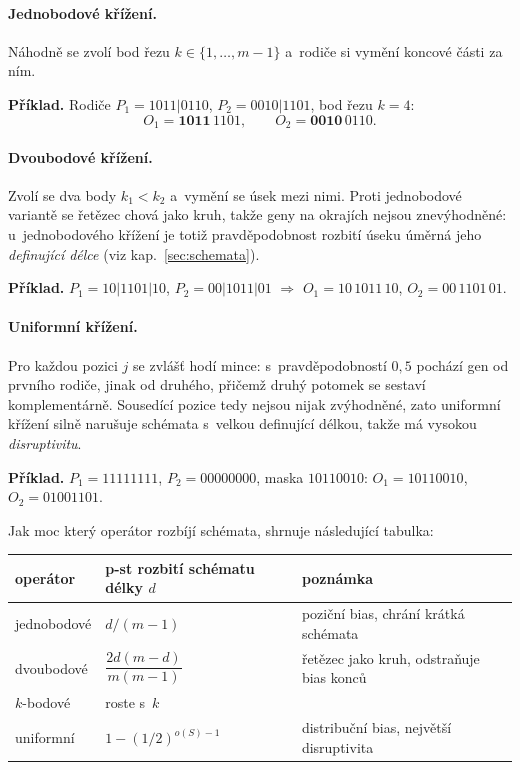 \documentclass[11pt,a4paper]{article}
\theoremstyle{definition}
\begin{document}
\paragraph{Jednobodové křížení.} Náhodně se zvolí bod řezu $k \in \{1,\dots,m-1\}$
a~rodiče si vymění koncové části za ním.

\textbf{Příklad.} Rodiče $P_1 = 1011|0110$, $P_2 = 0010|1101$, bod řezu $k=4$:
\[
O_1 = \mathbf{1011}\,1101, \qquad O_2 = \mathbf{0010}\,0110.
\]

\paragraph{Dvoubodové křížení.} Zvolí se dva body $k_1 < k_2$ a~vymění se úsek mezi nimi.
Proti jednobodové variantě se řetězec chová jako kruh, takže geny na okrajích nejsou
znevýhodněné: u~jednobodového křížení je totiž pravděpodobnost rozbití úseku úměrná jeho
\emph{definující délce} (viz kap.~\ref{sec:schemata}).

\textbf{Příklad.} $P_1 = 10|1101|10$, $P_2 = 00|1011|01$ $\Rightarrow$
$O_1 = 10\,1011\,10$, $O_2 = 00\,1101\,01$.

\paragraph{Uniformní křížení.} Pro každou pozici $j$ se zvlášť hodí mince:
s~pravděpodobností $0{,}5$ pochází gen od prvního rodiče, jinak od druhého, přičemž druhý
potomek se sestaví komplementárně. Sousedící pozice tedy nejsou nijak zvýhodněné, zato
uniformní křížení silně narušuje schémata s~velkou definující délkou, takže má vysokou
\emph{disruptivitu}.

\textbf{Příklad.} $P_1 = 11111111$, $P_2 = 00000000$, maska $10110010$:
$O_1 = 10110010$, $O_2 = 01001101$.

Jak moc který operátor rozbíjí schémata, shrnuje následující tabulka:

\begin{center}
\begin{tabular}{@{}lll@{}}
\toprule
\textbf{operátor} & \textbf{p-st rozbití schématu délky $d$} & \textbf{poznámka} \\
\midrule
jednobodové & $d/(m-1)$ & poziční bias, chrání krátká schémata \\
dvoubodové & $\dfrac{2d(m-d)}{m(m-1)}$ & řetězec jako kruh, odstraňuje bias konců \\
$k$-bodové & roste s~$k$ & \\
uniformní & $1 - (1/2)^{o(S)-1}$ & distribuční bias, největší disruptivita \\
\bottomrule
\end{tabular}
\end{center}
\end{document}
